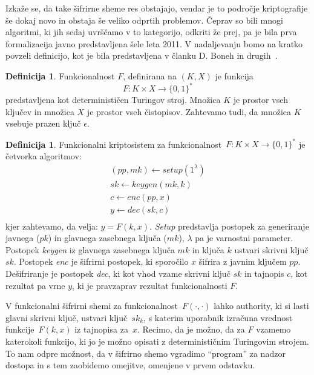 \documentclass[12pt,a4paper,openany,tikz]{book}
\theoremstyle{plain}
\theoremstyle{definition}
\newtheorem{defn}[thm]{Definicija} %
\begin{document}
Izkaže se, da take šifrirne sheme res obstajajo, vendar je to področje kriptografije še dokaj novo in obstaja še veliko odprtih problemov. Čeprav so bili mnogi algoritmi, ki jih sedaj uvrščamo v to kategorijo, odkriti že prej, pa je bila prva formalizacija javno predstavljena šele leta 2011. V nadaljevanju bomo na kratko povzeli definicijo, kot je bila predstavljena v članku D. Boneh in drugih~\cite{boneh2011functional}.

\begin{mdframed}[frametitle={Funkcionalnost}]
\begin{defn}
Funkcionalnost $F$, definirana na $(K, X)$ je funkcija $$F: K \times X \rightarrow {\{}0,1{\}}^*$$ predstavljena kot determinističen Turingov stroj. Množica $K$ je prostor vseh ključev in množica $X$ je prostor vseh čistopisov. Zahtevamo tudi, da množica $K$ vsebuje prazen ključ $\epsilon$.
\label{def:functionality}
\end{defn}
\end{mdframed}


\begin{mdframed}[frametitle={Funkcionalni kriptosistem}]
\begin{defn}
Funkcionalni kriptosistem za funkcionalnost~$F: K \times X \rightarrow {\{}0,1{\}}^*$ je četvorka algoritmov:
\begin{align*}
  (pp, mk) \leftarrow setup(1^\lambda) \\
  sk \leftarrow keygen(mk, k) \\
  c \leftarrow enc(pp, x)  \\
  y \leftarrow dec(sk, c)  \\
\end{align*}
kjer zahtevamo, da velja: $y=F(k, x)$.
\textit{Setup} predstavlja postopek za generiranje javnega ($pk$) in glavnega zasebnega ključa ($mk$), $\lambda$ pa je varnostni parameter. Postopek \textit{keygen} iz glavnega zasebnega ključa $mk$ in ključa $k$ ustvari skrivni ključ $sk$. Postopek \textit{enc} je šifrirni postopek, ki sporočilo $x$ šifrira z javnim ključem $pp$. Dešifriranje je postopek \textit{dec}, ki kot vhod vzame skrivni ključ $sk$ in tajnopis $c$, kot rezultat pa vrne $y$, ki je pravzaprav rezultat funkcionalnosti $F$.
\label{def:fe}
\end{defn}
\end{mdframed}

V funkcionalni šifrirni shemi za funkcionalnost~$F(\cdot, \cdot)$ lahko \gls{authority}, ki si lasti glavni skrivni ključ, ustvari ključ~$sk_k$, s katerim uporabnik izračuna vrednost funkcije~$F(k, x)$ iz tajnopisa za~$x$. Recimo, da je možno, da za $F$ vzamemo katerokoli funkcijo, ki jo je možno opisati z determinističnim Turingovim strojem. To nam odpre možnost, da v šifrirno shemo vgradimo ``program'' za nadzor dostopa in s tem zaobidemo omejitve, omenjene v prvem odstavku.
\end{document}
